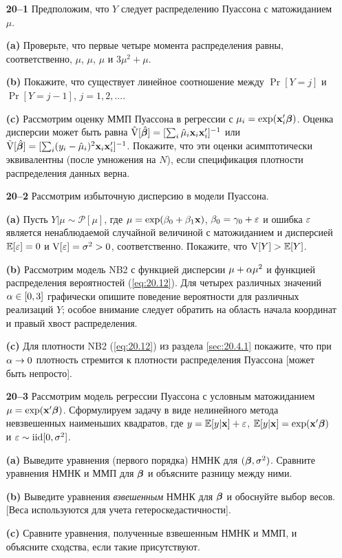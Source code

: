 \noindent
\begin{itemize}
    \item[\textbf{20--1}]
Предположим, что $Y$ следует распределению Пуассона с матожиданием $\mu$.
        \item[\textbf{(a)}]
Проверьте, что первые четыре момента распределения равны, соответственно, $\mu$, $\mu$, $\mu$ и $3\mu^2 + \mu$.
        \item[\textbf{(b)}]
Покажите, что существует линейное соотношение между $\Pr[Y = j]$ и $\Pr[Y = j - 1]$, $j = 1, 2, ...$.
        \item[\textbf{(c)}]
Рассмотрим оценку ММП Пуассона в регрессии с $\mu_i = \exp(\mathbf{x}_i'\bm{\beta})$. Оценка дисперсии может быть равна $\hat{\mathrm{V}}[\hat{\bm{\beta}}] = [\sum_i \hat{\mu}_i \mathbf{x}_i \mathbf{x}'_i]^{-1}$ или $\tilde{\mathrm{V}}[\hat{\bm{\beta}}] = [\sum_i (y_i - \hat{\mu}_i)^2 \mathbf{x}_i \mathbf{x}'_i]^{-1}$.
Покажите, что эти оценки асимптотически эквивалентны (после умножения на $N$), если спецификация плотности распределения данных верна.

    \item[\textbf{20--2}]
Рассмотрим избыточную дисперсию в модели Пуассона.
        \item[\textbf{(a)}]
Пусть $Y|\mu \sim \mathcal{P}[\mu]$, где $\mu = \exp(\beta_0 + \beta_1\mathbf{x})$, $\beta_0 = \gamma_0 + \varepsilon$ и ошибка $\varepsilon$ является ненаблюдаемой случайной величиной с матожиданием и дисперсией $\mathbb{E}[\varepsilon] = 0$ и $\mathrm{V}[\varepsilon] = \sigma^2 > 0$, соответственно. Покажите, что $\mathrm{V}[Y] > \mathbb{E}[Y]$.
        \item[\textbf{(b)}]
Рассмотрим модель NB2 с функцией дисперсии $\mu + \alpha \mu^2$ и функцией распределения вероятностей (\ref{eq:20.12}). Для четырех различных значений $\alpha \in [0, 3]$ графически опишите поведение вероятности для различных реализаций $Y$; особое внимание следует обратить на область начала координат и правый хвост распределения.
        \item[\textbf{(c)}]
Для плотности NB2 (\ref{eq:20.12}) из раздела \ref{sec:20.4.1} покажите, что при $\alpha \rightarrow 0$ плотность стремится к плотности распределения Пуассона [может быть непросто].

    \item[\textbf{20--3}]
Рассмотрим модель регрессии Пуассона с условным матожиданием $\mu = \exp(\mathbf{x}'\bm{\beta})$. Сформулируем задачу в виде нелинейного метода невзвешенных наименьших квадратов, где $y = \mathbb{E}[y|\mathbf{x}] + \varepsilon$, $\mathbb{E}[y|\mathbf{x}] = \exp(\mathbf{x}'\bm{\beta})$ и $\varepsilon \sim \mathrm{iid}[0, \sigma^2]$.
        \item[\textbf{(a)}]
Выведите уравнения (первого порядка) НМНК для $(\bm{\beta}, \sigma^2)$. Сравните уравнения НМНК и ММП для $\bm{\beta}$ и объясните разницу между ними.
        \item[\textbf{(b)}]
Выведите уравнения \textit{взвешенным} НМНК для $\bm{\beta}$ и обоснуйте выбор весов. [Веса используются для учета гетероскедастичности].
        \item[\textbf{(c)}]
Сравните уравнения, полученные взвешенным НМНК и ММП, и объясните сходства, если такие присутствуют.


\end{itemize}
